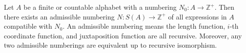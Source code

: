 Let $A$ be a finite or countable alphabet with a numbering $N_0: A \to \mathbb{Z}^+$. Then there exists an admissible numbering $N: S(A) \to \mathbb{Z}^+$ of all expressions in $A$ compatible with $N_0$. An admissible numbering means the length function, $i$-th coordinate function, and juxtaposition function are all recursive. Moreover, any two admissible numberings are equivalent up to recursive isomorphism.